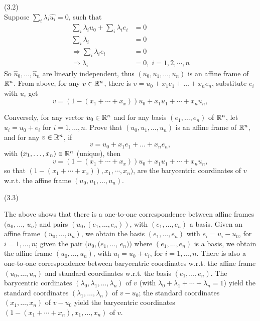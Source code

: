 \documentclass[12pt]{article}
\begin{document}
(3.2) \\
Suppose $\sum_i \lambda_i \widehat{u_i} = 0$, such that
\begin{align*}
\sum_i \lambda_i u_0 + \sum_i \lambda_i e_i &= 0 \\
\sum_i \lambda_i  &= 0 \\ 
\Rightarrow \sum_i \lambda_i e_i &= 0 \\
\Rightarrow \lambda_i &= 0, \; i = 1,2, \cdots, n
\end{align*}
So $\widehat{u}_0, \ldots,  \widehat{u}_{n}$ are linearly independent, thus $(u_0, u_1, \ldots, u_n)$ is an affine frame of $\mathbb{R}^n$.
From above, for any $v\in \mathbb{R}^n$, there is $v = u_0 + x_1 e_1 + \dots + x_n e_n$, substitute $e_i$ with $u_i$ get
\[
v = (1 - (x_1 + \cdots + x_x)) u_0 + x_1 u_1 + \cdots + x_n u_n,
\]
 

\medskip
Conversely, for any vector $u_0\in \mathbb{R}^n$ and for any basis
$(e_1, \ldots, e_n)$ of $\mathbb{R}^n$, let
$u_i = u_0 + e_i$ for $i = 1, \ldots, n$. Prove
that $(u_0, u_1, \ldots, u_n)$ is an affine frame of $\mathbb{R}^n$, 
and for any $v\in \mathbb{R}^n$, if  
\[
v = u_0 + x_1 e_1 + \dots + x_n e_n,
\]
with $(x_1, \ldots, x_n) \in \mathbb{R}^n$ (unique), then
\[
v = (1 - (x_1 + \cdots + x_x)) u_0 + x_1 u_1 + \cdots + x_n u_n,
\]
so that $(1 - (x_1 + \cdots + x_x)), x_1, \cdots,  x_n)$,
are the barycentric coordinates of $v$ w.r.t. the affine frame
$(u_0, u_1, \ldots, u_n)$.

(3.3) 

\medskip
The above shows that there is a one-to-one correspondence between
affine frames $(u_0, \ldots$, $u_n)$ and pairs
$(u_0, (e_1, \ldots, e_n))$, with  $(e_1, \ldots, e_n)$  a basis.
Given  an affine frame  $(u_0, \ldots, u_n)$, we obtain the basis
$(e_1, \ldots, e_n)$ with $e_i = u_i - u_0$, for $i = 1, \ldots, n$;
given the pair $(u_0, (e_1, \ldots$, $e_n))$ where  $(e_1, \ldots, e_n)$
is a basis,  we obtain the affine frame   $(u_0, \ldots, u_n)$, with
$u_i = u_0 + e_i$, for $i = 1, \ldots, n$.
There is also a  one-to-one correspondence between
barycentric coordinates w.r.t. the affine frame
$(u_0, \ldots, u_n)$ and standard coordinates w.r.t.
the basis   $(e_1, \ldots, e_n)$.
The barycentric cordinates $(\lambda_0, \lambda_1, \ldots, \lambda_n)$
of $v$
(with $\lambda_0 + \lambda_1 + \cdots + \lambda_n = 1$) 
yield the standard coordinates $(\lambda_1, \ldots, \lambda_n)$ of $v - u_0$;
the standard coordinates $(x_1, \ldots, x_n)$ of $v - u_0$ yield the 
barycentric coordinates $(1 - (x_1 + \cdots + x_n ), x_1, \ldots,
x_n)$ of $v$.
\end{document}
